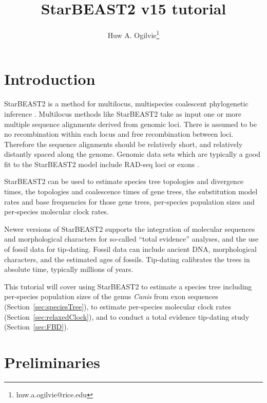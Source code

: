 \documentclass[12pt]{article}
\begin{document}
\title{StarBEAST2 v15 tutorial}
\author[1]{Huw A. Ogilvie\thanks{huw.a.ogilvie@rice.edu}}

\maketitle

\clearpage

\section{Introduction}
\label{sec:intro}

StarBEAST2 is a method for multilocus, multispecies coalescent phylogenetic
inference \citep{Ogilvie2017}. Multilocus methods like StarBEAST2 take as
input one or more multiple sequence alignments derived from genomic loci.
There is assumed to be no recombination within each locus and free
recombination between loci. Therefore the sequence alignments should be
relatively short, and relatively distantly spaced along the genome. Genomic
data sets which are typically a good fit to the StarBEAST2 model include
RAD-seq loci \citep{Ogilvie2016} or exons \citep{Scornavacca2017}.

StarBEAST2 can be used to estimate species tree topologies and divergence
times, the topologies and coalescence times of gene trees, the substitution
model rates and base frequencies for those gene trees, per-species population
sizes and per-species molecular clock rates.

Newer versions of StarBEAST2 supports the integration of molecular sequences
and morphological characters for so-called ``total evidence'' analyses, and
the use of fossil data for tip-dating. Fossil data can include ancient DNA,
morphological characters, and the estimated ages of fossils. Tip-dating
calibrates the trees in absolute time, typically millions of years.

This tutorial will cover using StarBEAST2 to estimate a species tree including
per-species population sizes of the genus \textit{Canis} from exon sequences
(Section~\ref{sec:speciesTree}),
to estimate per-species molecular clock rates
(Section~\ref{sec:relaxedClock}),
and to conduct a total evidence tip-dating study
(Section~\ref{sec:FBD}).

\section{Preliminaries}
\label{sec:prelim}
\end{document}
